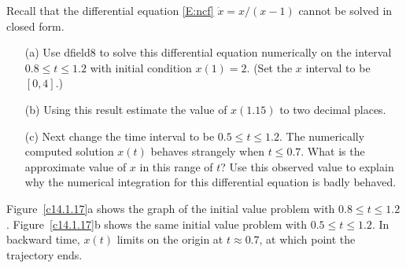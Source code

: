 \documentclass{ximera}
\begin{document}
\begin{exercise} \label{c14.1.17}
Recall that the differential equation \eqref{E:ncf} $\dot{x}=x/(x-1)$ cannot be 
solved in closed form.  
\begin{itemize}
\item[(a)]	Use {\sf dfield8} 
to solve this differential 
equation numerically on the interval $0.8\leq t\leq 1.2$ with initial 
condition $x(1)=2$.  (Set the $x$ interval to be $[0,4]$.)  
\item[(b)]	Using this result estimate the value of $x(1.15)$ to two 
decimal places.
\item[(c)]	Next change the time interval to be $0.5\leq t\leq 1.2$.
The numerically computed solution $x(t)$ behaves strangely when $t\leq 0.7$. 
What is the approximate value of $x$ in this range of $t$?  Use this 
observed value to explain why the numerical integration for this differential 
equation is badly behaved.
\end{itemize}

\begin{solution}
Figure~\ref{c14.1.17}a shows the graph of the initial
value problem with $0.8 \leq t \leq 1.2$.  Figure~\ref{c14.1.17}b shows
the same initial value problem with $0.5 \leq t \leq 1.2$.  In
backward time, $x(t)$ limits on the origin at $t \approx 0.7$, at
which point the trajectory ends.

\begin{figure}[htb]
                       \centerline{%
                       }
\end{figure}

\end{solution}
\end{exercise}
\end{document}
